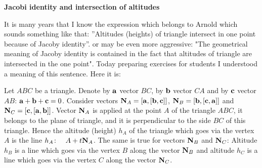 \def\vare {\varepsilon}
\def\A {{\bf A}}
\def\t {\tilde}
\def\a {\alpha}
\def\K {{\bf K}}
\def\N {{\bf N}}
\def\V {{\cal V}}
\def\s {{\sigma}}
\def\S {{\Sigma}}
\def\s {{\sigma}}
\def\p{\partial}
\def\vare{{\varepsilon}}
\def\Q {{\bf Q}}
\def\D {{\cal D}}
\def\G {{\Gamma}}
\def\C {{\bf C}}
\def\M {{\cal M}}
\def\Z {{\bf Z}}
\def\U  {{\cal U}}
\def\H {{\cal H}}
\def\R  {{\bf R}}
\def\E  {{\bf E}}
\def\l {\lambda}
\def\degree {{\bf {\rm degree}\,\,}}
\def \finish {${\,\,\vrule height1mm depth2mm width 8pt}$}
\def \m {\medskip}
\def\p {\partial}
\def\r {{\bf r}}
\def\v {{\bf v}}
\def\n {{\bf n}}
\def\t {{\bf t}}
\def\b {{\bf b}}
\def\c {{\bf c }}
\def\e{{\bf e}}
\def\ac {{\bf a}}
\def \X   {{\bf X}}
\def \Y   {{\bf Y}}
\def \x   {{\bf x}}
\def \y   {{\bf y}}

\centerline  {\bf  Jacobi identity and intersection of altitudes}

\bigskip

  It is many years that I know the expression which belongs to Arnold which sounds something like
  that: ''Altitudes (heights) of triangle intersect in one point because of Jacoby identity''.
  or may be even more aggressive: "The geometrical meaning of Jacoby identity is contained in the fact that
    altitudes of triangle are intersected in the one point".
  Today preparing exercises for students I understood a meaning of this sentence. Here it is:

\m

  Let $ABC$ be a triangle. Denote by $\ac$ vector $BC$, by $\b$ vector $CA$ and by $\c$ vector $AB$:
  $\ac+\b+\c=0$.
   Consider vectors $\N_A=[\ac,[\b,\c]]$, $\N_B=[\b,[\c,\ac]]$ and $\N_C=[\c,[\ac,\b]]$.
   Vector $\N_A$ is applied at the point $A$ of the triangle $ABC$, it  belongs to the plane of triangle, and
   it is perpendicular to
   the side $BC$ of this triangle.  Hence the altitude (height) $h_A$ of the triangle
    which goes via the vertex $A$
   is the line $h_A\colon\quad A+t\N_A$. The same is true for vectors $\N_B$ and $\N_C$:
    Altitude $h_B$ is a line which goes via the vertex $B$ along the vector $\N_B$ and
    altitude $h_C$  is a line which goes via the vertex $C$ along the vector $\N_C$.

